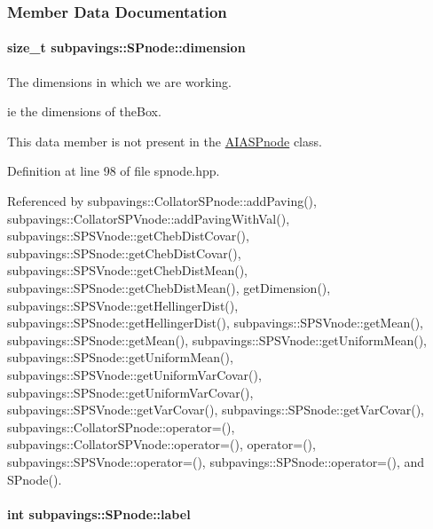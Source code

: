 \subsubsection{\-Member \-Data \-Documentation}
\hypertarget{classsubpavings_1_1SPnode_ac28ce64cdc1aed5e545659699a38c16e}{
\paragraph[{dimension}]{\setlength{\rightskip}{0pt plus 5cm}size\-\_\-t {\bf subpavings\-::\-S\-Pnode\-::dimension}}}\label{classsubpavings_1_1SPnode_ac28ce64cdc1aed5e545659699a38c16e}


\-The dimensions in which we are working. 

ie the dimensions of the\-Box.

\-This data member is not present in the \hyperlink{classAIASPnode}{\-A\-I\-A\-S\-Pnode} class. 

\-Definition at line 98 of file spnode.\-hpp.



\-Referenced by subpavings\-::\-Collator\-S\-Pnode\-::add\-Paving(), subpavings\-::\-Collator\-S\-P\-Vnode\-::add\-Paving\-With\-Val(), subpavings\-::\-S\-P\-S\-Vnode\-::get\-Cheb\-Dist\-Covar(), subpavings\-::\-S\-P\-Snode\-::get\-Cheb\-Dist\-Covar(), subpavings\-::\-S\-P\-S\-Vnode\-::get\-Cheb\-Dist\-Mean(), subpavings\-::\-S\-P\-Snode\-::get\-Cheb\-Dist\-Mean(), get\-Dimension(), subpavings\-::\-S\-P\-S\-Vnode\-::get\-Hellinger\-Dist(), subpavings\-::\-S\-P\-Snode\-::get\-Hellinger\-Dist(), subpavings\-::\-S\-P\-S\-Vnode\-::get\-Mean(), subpavings\-::\-S\-P\-Snode\-::get\-Mean(), subpavings\-::\-S\-P\-S\-Vnode\-::get\-Uniform\-Mean(), subpavings\-::\-S\-P\-Snode\-::get\-Uniform\-Mean(), subpavings\-::\-S\-P\-S\-Vnode\-::get\-Uniform\-Var\-Covar(), subpavings\-::\-S\-P\-Snode\-::get\-Uniform\-Var\-Covar(), subpavings\-::\-S\-P\-S\-Vnode\-::get\-Var\-Covar(), subpavings\-::\-S\-P\-Snode\-::get\-Var\-Covar(), subpavings\-::\-Collator\-S\-Pnode\-::operator=(), subpavings\-::\-Collator\-S\-P\-Vnode\-::operator=(), operator=(), subpavings\-::\-S\-P\-S\-Vnode\-::operator=(), subpavings\-::\-S\-P\-Snode\-::operator=(), and \-S\-Pnode().

\hypertarget{classsubpavings_1_1SPnode_a4add69f42780515a4f817f02770e38cb}{
\paragraph[{label}]{\setlength{\rightskip}{0pt plus 5cm}int {\bf subpavings\-::\-S\-Pnode\-::label}}}\label{classsubpavings_1_1SPnode_a4add69f42780515a4f817f02770e38cb}


